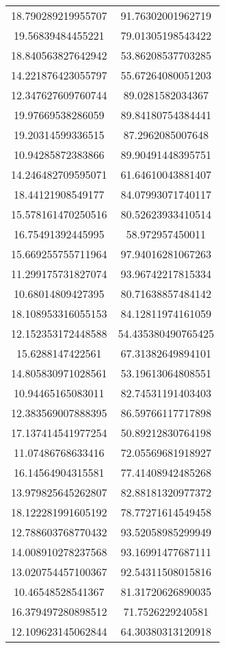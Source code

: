\begin{table}
\begin{tabular}{cc}
18.790289219955707 & 91.76302001962719 \\
19.56839484455221 & 79.01305198543422 \\
18.840563827642942 & 53.86208537703285 \\
14.221876423055797 & 55.67264080051203 \\
12.347627609760744 & 89.0281582034367 \\
19.97669538286059 & 89.84180754384441 \\
19.20314599336515 & 87.2962085007648 \\
10.94285872383866 & 89.90491448395751 \\
14.246482709595071 & 61.64610043881407 \\
18.44121908549177 & 84.07993071740117 \\
15.578161470250516 & 80.52623933410514 \\
16.75491392445995 & 58.972957450011 \\
15.669255755711964 & 97.94016281067263 \\
11.299175731827074 & 93.96742217815334 \\
10.68014809427395 & 80.71638857484142 \\
18.108953316055153 & 84.12811974161059 \\
12.152353172448588 & 54.435380490765425 \\
15.6288147422561 & 67.31382649894101 \\
14.805830971028561 & 53.19613064808551 \\
10.94465165083011 & 82.74531191403403 \\
12.383569007888395 & 86.59766117717898 \\
17.137414541977254 & 50.89212830764198 \\
11.07486768633416 & 72.05569681918927 \\
16.14564904315581 & 77.41408942485268 \\
13.979825645262807 & 82.88181320977372 \\
18.122281991605192 & 78.77271614549458 \\
12.788603768770432 & 93.52058985299949 \\
14.008910278237568 & 93.16991477687111 \\
13.020754457100367 & 92.54311508015816 \\
10.46548528541367 & 81.31720626890035 \\
16.379497280898512 & 71.7526229240581 \\
12.109623145062844 & 64.30380313120918 \\

\end{tabular}
\end{table}
